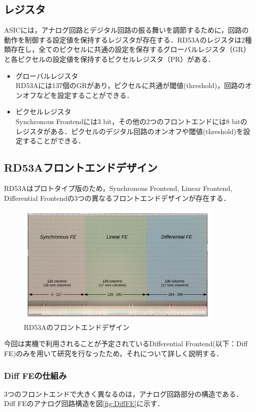\subsection{レジスタ}
ASICには，アナログ回路とデジタル回路の振る舞いを調節するために，回路の動作を制御する設定値を保持するレジスタが存在する．RD53Aのレジスタは2種類存在し，全てのピクセルに共通の設定を保存するグローバルレジスタ（GR）と各ピクセルの設定値を保持するピクセルレジスタ（PR）がある．
\begin{itemize}
\item グローバルレジスタ\\
  RD53Aには137個のGRがあり，ピクセルに共通が閾値(threshold)，回路のオンオフなどを設定することができる．
\item ピクセルレジスタ\\
  Synchronous Frontendには3 $\mathrm{bit}$，その他の2つのフロントエンドには8 $\mathrm{bit}$のレジスタがある．ピクセルのデジタル回路のオンオフや閾値(threshold)を設定することができる．
\end{itemize}


\subsection{RD53Aフロントエンドデザイン}
RD53Aはプロトタイプ版のため，Synchronous Frontend, Linear Frontend, Differential Frontendの3つの異なるフロントエンドデザインが存在する．

\begin{figure}[h]
\centering
\includegraphics[width=10cm]{./figure/RD53A_FE.png}
\caption{RD53Aのフロントエンドデザイン\cite{Garcia-Sciveres:2287593}}
\label{fig:RD53AFE}
\end{figure}

今回は実機で利用されることが予定されているDifferential Frontend(以下：Diff FE)のみを用いて研究を行なったため，それについて詳しく説明する．

\subsubsection*{Diff FEの仕組み}
3つのフロントエンドで大きく異なるのは，アナログ回路部分の構造である．Diff FEのアナログ回路構造を図\ref{fig:DiffFE}に示す．\par

